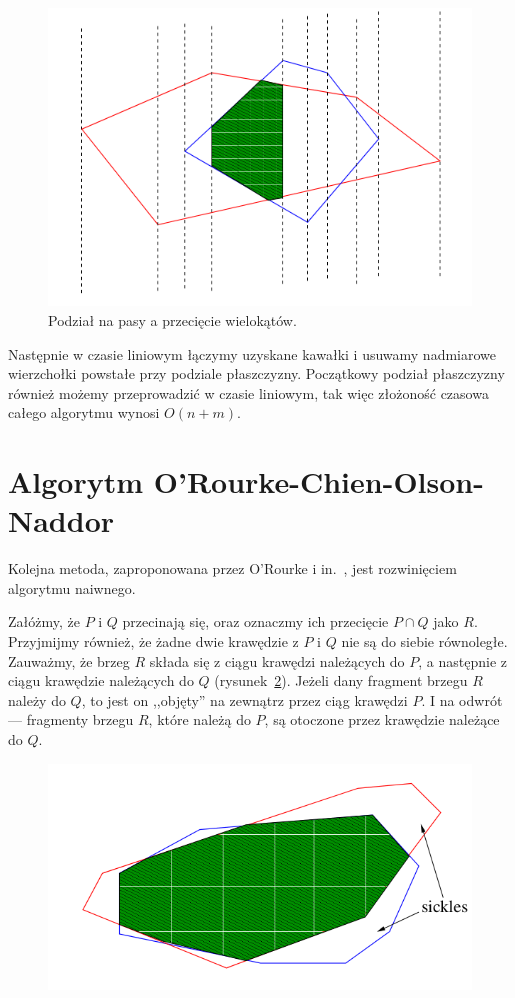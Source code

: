 \begin{figure}[htb]
  \centering
  \includegraphics[scale=0.5]{img/ShamosHoey76}
  \caption{Podział na pasy a przecięcie
    wielokątów.\label{img:ShamosHoey76}}
\end{figure}

Następnie w czasie liniowym łączymy uzyskane kawałki i usuwamy
nadmiarowe wierzchołki powstałe przy podziale płaszczyzny. Początkowy
podział płaszczyzny również możemy przeprowadzić w czasie liniowym,
tak więc złożoność czasowa całego algorytmu wynosi $O(n + m)$.

\section{Algorytm O'Rourke-Chien-Olson-Naddor}
Kolejna metoda, zaproponowana przez O'Rourke i in.~\cite{Orourke98},
jest rozwinięciem algorytmu naiwnego.

Załóżmy, że $P$ i $Q$ przecinają się, oraz oznaczmy ich przecięcie $P
\cap Q$ jako $R$. Przyjmijmy również, że żadne dwie krawędzie z $P$ i
$Q$ nie są do siebie równoległe. Zauważmy, że brzeg $R$ składa się z
ciągu krawędzi należących do $P$, a następnie z ciągu krawędzie
należących do $Q$ (rysunek~\ref{img:sickles}). Jeżeli dany fragment
brzegu $R$ należy do $Q$, to jest on ,,objęty'' na zewnątrz przez ciąg
krawędzi $P$. I na odwrót --- fragmenty brzegu $R$, które należą do
$P$, są otoczone przez krawędzie należące do $Q$.

\begin{figure}[htb]
  \centering
  \includegraphics[scale=0.5]{img/Orourke98}
  \caption{\label{img:sickles}}
\end{figure}

